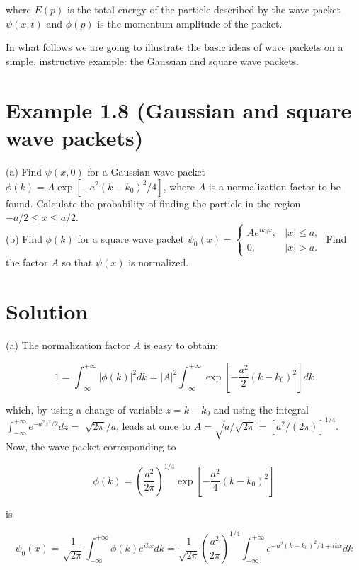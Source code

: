 \documentclass[10pt]{article}
\begin{document}
where $E(p)$ is the total energy of the particle described by the wave packet $\psi(x, t)$ and $\tilde{\phi}(p)$ is the momentum amplitude of the packet.

In what follows we are going to illustrate the basic ideas of wave packets on a simple, instructive example: the Gaussian and square wave packets.

\section*{Example 1.8 (Gaussian and square wave packets)}
(a) Find $\psi(x, 0)$ for a Gaussian wave packet $\phi(k)=A \exp \left[-a^{2}\left(k-k_{0}\right)^{2} / 4\right]$, where $A$ is a normalization factor to be found. Calculate the probability of finding the particle in the region $-a / 2 \leq x \leq a / 2$.\\
(b) Find $\phi(k)$ for a square wave packet $\psi_{0}(x)= \begin{cases}A e^{i k_{0} x}, & |x| \leq a, \\ 0, & |x|>a .\end{cases}$ Find the factor $A$ so that $\psi(x)$ is normalized.

\section*{Solution}
(a) The normalization factor $A$ is easy to obtain:


\begin{equation*}
1=\int_{-\infty}^{+\infty}|\phi(k)|^{2} d k=|A|^{2} \int_{-\infty}^{+\infty} \exp \left[-\frac{a^{2}}{2}\left(k-k_{0}\right)^{2}\right] d k \tag{1.101}
\end{equation*}


which, by using a change of variable $z=k-k_{0}$ and using the integral $\int_{-\infty}^{+\infty} e^{-a^{2} z^{2} / 2} d z=$ $\sqrt{2 \pi} / a$, leads at once to $A=\sqrt{a / \sqrt{2 \pi}}=\left[a^{2} /(2 \pi)\right]^{1 / 4}$. Now, the wave packet corresponding to


\begin{equation*}
\phi(k)=\left(\frac{a^{2}}{2 \pi}\right)^{1 / 4} \exp \left[-\frac{a^{2}}{4}\left(k-k_{0}\right)^{2}\right] \tag{1.102}
\end{equation*}


is


\begin{equation*}
\psi_{0}(x)=\frac{1}{\sqrt{2 \pi}} \int_{-\infty}^{+\infty} \phi(k) e^{i k x} d k=\frac{1}{\sqrt{2 \pi}}\left(\frac{a^{2}}{2 \pi}\right)^{1 / 4} \int_{-\infty}^{+\infty} e^{-a^{2}\left(k-k_{0}\right)^{2} / 4+i k x} d k \tag{1.103}
\end{equation*}
\end{document}

